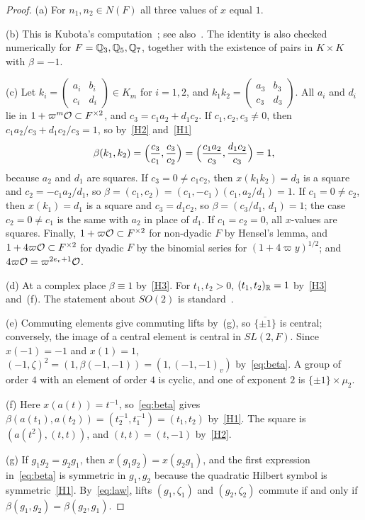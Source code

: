 \begin{proof}
(a) For $n_1,n_2\in N(F)$ all three values of $x$ equal $1$.

(b) This is Kubota's computation~\cite{Ku69}; see also~\cite{Ge76}. The
identity is also checked numerically for $F=\mathbb{Q}_3,\mathbb{Q}_5,\mathbb{Q}_7$, together
with the existence of pairs in $K\times K$ with $\beta=-1$.

(c) Let $k_i=\begin{pmatrix}a_i&b_i\\c_i&d_i\end{pmatrix}\in K_m$ for
$i=1,2$, and $k_1k_2=\begin{pmatrix}a_3&b_3\\c_3&d_3\end{pmatrix}$. All
$a_i$ and $d_i$ lie in $1+\varpi^m\mathcal{O}\subset F^{\times2}$, and
$c_3=c_1a_2+d_1c_2$. If $c_1,c_2,c_3\neq0$, then
$c_1a_2/c_3+d_1c_2/c_3=1$, so by~\ref{H2} and~\ref{H1}
\[
\beta(k_1,k_2)=\Bigl(\frac{c_3}{c_1},\frac{c_3}{c_2}\Bigr)
=\Bigl(\frac{c_1a_2}{c_3},\frac{d_1c_2}{c_3}\Bigr)=1,
\]
because $a_2$ and $d_1$ are squares. If $c_3=0\neq c_1c_2$, then
$x(k_1k_2)=d_3$ is a square and $c_2=-c_1a_2/d_1$, so
$\beta=(c_1,c_2)=(c_1,-c_1)(c_1,a_2/d_1)=1$. If $c_1=0\ne c_2$, then
$x(k_1)=d_1$ is a square and $c_3=d_1c_2$, so
$\beta=(c_3/d_1,\,d_1)=1$; the case $c_2=0\neq c_1$ is the same with
$a_2$ in place of $d_1$. If $c_1=c_2=0$, all $x$-values are squares.
Finally, $1+\varpi\mathcal{O}\subset F^{\times2}$ for non-dyadic $F$ by Hensel's
lemma, and $1+4\varpi\mathcal{O}\subset F^{\times2}$ for dyadic $F$ by the
binomial series for $(1+4\varpi y)^{1/2}$; and $4\varpi\mathcal{O}=
\varpi^{2e_v+1}\mathcal{O}$.

(d) At a complex place $\beta\equiv1$ by~\ref{H3}. For $t_1,t_2>0$,
$(t_1,t_2)_{\mathbb{R}}=1$ by~\ref{H3} and~(f). The statement about $SO(2)$ is
standard~\cite{Ge76}.

(e) Commuting elements give commuting lifts by~(g), so
$\overline{\{\pm1\}}$ is central; conversely, the image of a central
element is central in $SL(2,F)$. Since $x(-1)=-1$ and $x(1)=1$,
$(-1,\zeta)^2=(1,\beta(-1,-1))=(1,(-1,-1)_v)$ by~\eqref{eq:beta}. A
group of order $4$ with an element of order $4$ is cyclic, and one of
exponent $2$ is $\{\pm1\}\times\mu_2$.

(f) Here $x(a(t))=t^{-1}$, so~\eqref{eq:beta} gives
$\beta(a(t_1),a(t_2))=(t_2^{-1},t_1^{-1})=(t_1,t_2)$ by~\ref{H1}. The
square is $(a(t^2),(t,t))$, and $(t,t)=(t,-1)$ by~\ref{H2}.

(g) If $g_1g_2=g_2g_1$, then $x(g_1g_2)=x(g_2g_1)$, and the first
expression in~\eqref{eq:beta} is symmetric in $g_1,g_2$ because the
quadratic Hilbert symbol is symmetric~\ref{H1}. By~\eqref{eq:law}, lifts
$(g_1,\zeta_1)$ and $(g_2,\zeta_2)$ commute if and only if
$\beta(g_1,g_2)=\beta(g_2,g_1)$.


\end{proof}
